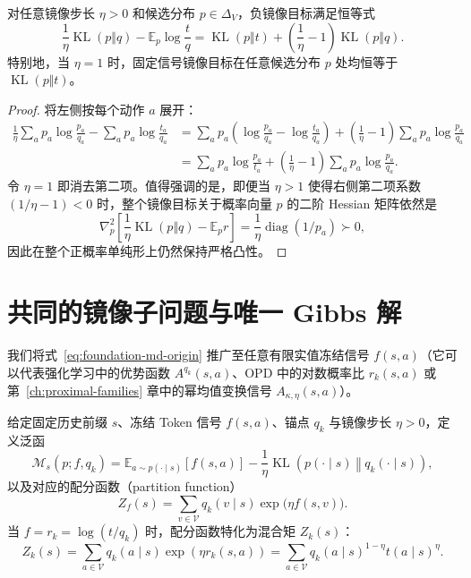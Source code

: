 \documentclass[lang=cn,scheme=chinese,openany]{elegantbook}
\newcommand{\E}{\mathbb E}
\newcommand{\KL}{\operatorname{KL}}
\begin{document}
\begin{proposition}
\label{prop:foundation-kl-objective}
对任意镜像步长 $\eta>0$ 和候选分布 $p\in\Delta_V$，负镜像目标满足恒等式
\begin{equation}
\frac1\eta\KL(p\Vert q)-\E_p\log\frac tq
=\KL(p\Vert t)+\left(\frac1\eta-1\right)\KL(p\Vert q).
\label{eq:foundation-kl-mixture}
\end{equation}
特别地，当 $\eta=1$ 时，固定信号镜像目标在任意候选分布 $p$ 处均恒等于 $\KL(p\Vert t)$。
\end{proposition}
\begin{proof}
将左侧按每个动作 $a$ 展开：
\begin{align}
\frac1\eta\sum_a p_a\log\frac{p_a}{q_a}
-\sum_a p_a\log\frac{t_a}{q_a}
&=\sum_a p_a\left(\log\frac{p_a}{q_a}-\log\frac{t_a}{q_a}\right)
+\left(\frac1\eta-1\right)\sum_a p_a\log\frac{p_a}{q_a}\nonumber\\
&=\sum_a p_a\log\frac{p_a}{t_a}
+\left(\frac1\eta-1\right)\sum_a p_a\log\frac{p_a}{q_a}.
\end{align}
令 $\eta=1$ 即消去第二项。值得强调的是，即便当 $\eta>1$ 使得右侧第二项系数 $(1/\eta-1)<0$ 时，整个镜像目标关于概率向量 $p$ 的二阶 Hessian 矩阵依然是
\begin{equation}
\nabla_p^2\left[\frac1\eta\KL(p\Vert q)-\E_p r\right]
=\frac1\eta\operatorname{diag}(1/p_a)\succ0,
\end{equation}
因此在整个正概率单纯形上仍然保持严格凸性。
\end{proof}

\section{共同的镜像子问题与唯一 Gibbs 解}
\label{sec:ch2-common}

我们将式~\eqref{eq:foundation-md-origin} 推广至任意有限实值冻结信号 $f(s,a)$（它可以代表强化学习中的优势函数 $A^{q_k}(s,a)$、OPD 中的对数概率比 $r_k(s,a)$ 或第~\ref{ch:proximal-families} 章中的幂均值变换信号 $A_{\kappa,\eta}(s,a)$）。

\begin{definition}
\label{def:ch2-mirror-subproblem}
给定固定历史前缀 $s$、冻结 Token 信号 $f(s,a)$、锚点 $q_k$ 与镜像步长 $\eta>0$，定义泛函
\begin{equation}
\label{eq:ch2-mirror}
\mathcal M_s(p;f, q_k)
=\mathbb E_{a\sim p(\cdot\mid s)}[f(s,a)]
-\frac1\eta\operatorname{KL}\!\left(p(\cdot\mid s)\middle\Vert q_k(\cdot\mid s)\right),
\end{equation}
以及对应的配分函数（partition function）
\begin{equation}
\label{eq:ch2-mirror-normalizer}
Z_f(s)=\sum_{v\in\mathcal V} q_k(v\mid s)\exp\!\bigl(\eta f(s,v)\bigr).
\end{equation}
当 $f=r_k=\log(t/q_k)$ 时，配分函数特化为混合矩 $Z_k(s)$：
\begin{equation}\label{eq:token-partition}
 Z_k(s)=\sum_{a\in\mathcal V} q_k(a\mid s)\exp(\eta r_k(s,a))
 =\sum_{a\in\mathcal V} q_k(a\mid s)^{1-\eta} t(a\mid s)^\eta.
\end{equation}
\end{definition}
\end{document}
